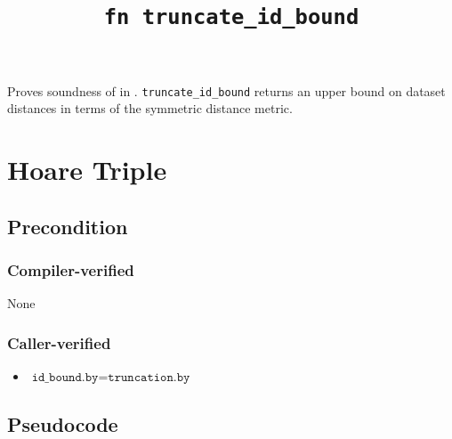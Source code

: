 \documentclass{article}
\title{\texttt{fn truncate\_id\_bound}}
\author{\MichaelShoemateAuthor}
\begin{document}
\maketitle


\contrib

Proves soundness of 
in .
\texttt{truncate\_id\_bound} returns an upper bound on dataset distances in terms of the symmetric distance metric.

\section{Hoare Triple}
\subsection*{Precondition}
\subsubsection*{Compiler-verified}
None

\subsubsection*{Caller-verified}
\begin{itemize}
    \item $\texttt{id\_bound.by} = \texttt{truncation.by}$
\end{itemize}


\subsection*{Pseudocode}
\label{sec:python-pseudocode}

\end{document}
